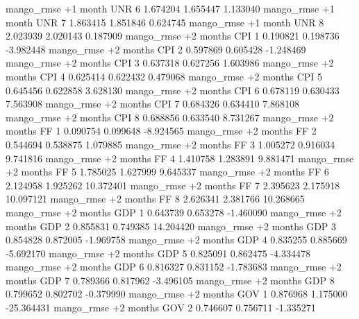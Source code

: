 mango_rmse  +1 month      UNR                 6 1.674204       1.655447           1.133040
mango_rmse  +1 month      UNR                 7 1.863415       1.851846           0.624745
mango_rmse  +1 month      UNR                 8 2.023939       2.020143           0.187909
mango_rmse +2 months      CPI                 1 0.190821       0.198736          -3.982448
mango_rmse +2 months      CPI                 2 0.597869       0.605428          -1.248469
mango_rmse +2 months      CPI                 3 0.637318       0.627256           1.603986
mango_rmse +2 months      CPI                 4 0.625414       0.622432           0.479068
mango_rmse +2 months      CPI                 5 0.645456       0.622858           3.628130
mango_rmse +2 months      CPI                 6 0.678119       0.630433           7.563908
mango_rmse +2 months      CPI                 7 0.684326       0.634410           7.868108
mango_rmse +2 months      CPI                 8 0.688856       0.633540           8.731267
mango_rmse +2 months       FF                 1 0.090754       0.099648          -8.924565
mango_rmse +2 months       FF                 2 0.544694       0.538875           1.079885
mango_rmse +2 months       FF                 3 1.005272       0.916034           9.741816
mango_rmse +2 months       FF                 4 1.410758       1.283891           9.881471
mango_rmse +2 months       FF                 5 1.785025       1.627999           9.645337
mango_rmse +2 months       FF                 6 2.124958       1.925262          10.372401
mango_rmse +2 months       FF                 7 2.395623       2.175918          10.097121
mango_rmse +2 months       FF                 8 2.626341       2.381766          10.268665
mango_rmse +2 months      GDP                 1 0.643739       0.653278          -1.460090
mango_rmse +2 months      GDP                 2 0.855831       0.749385          14.204420
mango_rmse +2 months      GDP                 3 0.854828       0.872005          -1.969758
mango_rmse +2 months      GDP                 4 0.835255       0.885669          -5.692170
mango_rmse +2 months      GDP                 5 0.825091       0.862475          -4.334478
mango_rmse +2 months      GDP                 6 0.816327       0.831152          -1.783683
mango_rmse +2 months      GDP                 7 0.789366       0.817962          -3.496105
mango_rmse +2 months      GDP                 8 0.799652       0.802702          -0.379990
mango_rmse +2 months      GOV                 1 0.876968       1.175000         -25.364431
mango_rmse +2 months      GOV                 2 0.746607       0.756711          -1.335271

